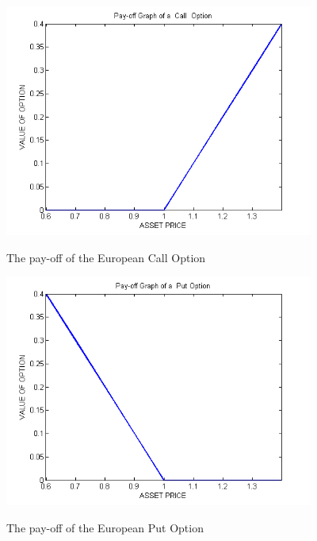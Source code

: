 \documentclass[12pt]{article}
\numberwithin{equation}{section} %
\begin{document}
\begin{figure}[h]
\begin{centering}
\vskip -0.5in
\includegraphics*[height=3in]{calloption.png}\
\caption{The pay-off of the European Call Option }
\includegraphics*[height=3in]{putoption2.png}\
\caption{The pay-off of the European Put Option } \vskip -0.5in
\end{centering}
\end{figure}

\end{document}
